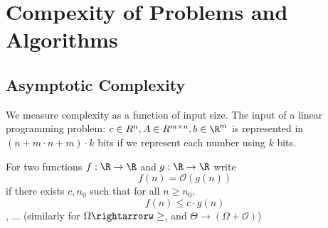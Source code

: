 
\chapter{Compexity of Problems and Algorithms}
\label{cha:comp-probl-algor}

\section{Asymptotic Complexity}
\label{sec:asympt-compl}

We measure complexity as a function of input size.  The input of a
linear programming problem: $c \in R^{n}, A \in R^{m \times n}, b \in
\R^{m}$ is represented in $(n + m \cdot n + m) \cdot k$ bits if we
represent each number using $k$ bits.

For two functions $f: \R \rightarrow \R$ and $g: \R \rightarrow \R$
write
\begin{equation}
  \label{eq:27}
  f(n) = \mathcal{O}(g(n))
\end{equation} if there exists $c, n_{0}$ such that for all $n \geq n_{0}$,
\begin{equation}
  \label{eq:27}
  f(n) \leq c \cdot g(n)
\end{equation}, ... (similarly for $\Omega \rightarrorw \geq$, and
$\Theta \rightarrow (\Omega + \mathcal{O})$)


